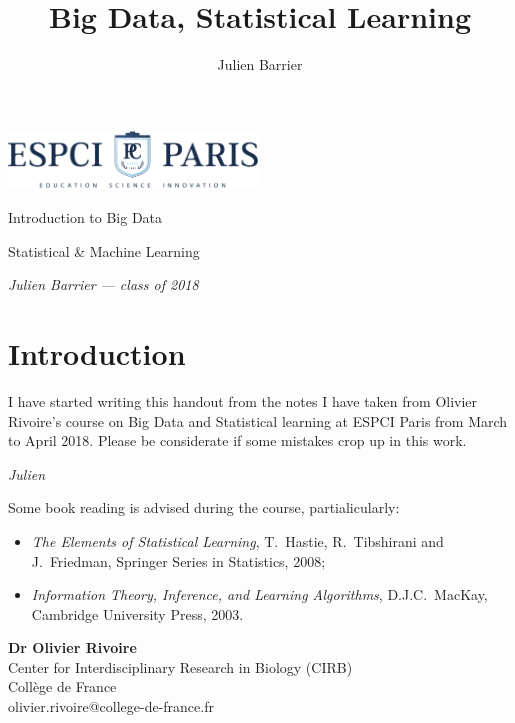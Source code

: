 \documentclass[a4paper]{tufte-book}
\title{Big Data, Statistical Learning}
\author{Julien Barrier}
\newcommand{\thetitle}{Introduction to Big Data}
\newcommand{\theauthor}{Julien Barrier --- class of 2018}
\newcommand{\pc}{ESPCI Paris}
\newcommand{\thesubtitle}{Statistical \& Machine Learning}
\begin{document}
\frontmatter

\thispagestyle{empty}
\begin{fullwidth}
    \setlength{\parindent}{0pt}
    \begin{center}
        \fontsize{24}{24}\selectfont\textit{
            \includegraphics*[width=2.6in]{ESPCI_baseline_couleur}
        }
    \end{center}
    \vspace{3in}\fontsize{36}{54}\selectfont\thetitle

    \vspace{0.125in}\fontsize{18}{18}\selectfont\thesubtitle

    \vfill\fontsize{14}{14}\selectfont\textit{\theauthor}
\end{fullwidth}

\newpage

\cleardoublepage
\chapter*{Introduction}

I have started writing this handout from the notes I have taken from
Olivier Rivoire's course on Big Data and Statistical learning at \pc{} from
March to April 2018. 
Please be considerate if some mistakes crop up in this work.

\emph{Julien}
\vspace{1cm}

Some book reading is advised during the course, partialicularly:

\begin{itemize}
    \item \emph{The Elements of Statistical Learning}, T.~Hastie, R.~Tibshirani and J.~Friedman, Springer Series in Statistics, 2008;
    \item \emph{Information Theory, Inference, and Learning Algorithms}, D.J.C.~MacKay, Cambridge University Press, 2003.
\end{itemize}

\vspace{1cm}

\textbf{Dr Olivier Rivoire}\\
Center for Interdisciplinary Research in Biology (CIRB)\\
Collège de France\\
olivier.rivoire@college-de-france.fr\\
\end{document}
